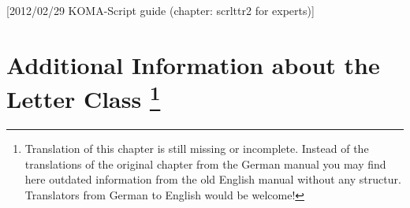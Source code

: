 %
%
%
%
%
%
%
%
% 
%
%
%
%

[2012/02/29 KOMA-Script guide (chapter:
scrlttr2 for experts)]



\chapter{Additional Information about the Letter Class
  \protect\footnote{Translation of this chapter is still
    missing or incomplete. Instead of the translations of the original chapter
    from the German manual you may find here outdated information from the old
    English manual without any structur. Translators from German to English
    would be welcome!}}

